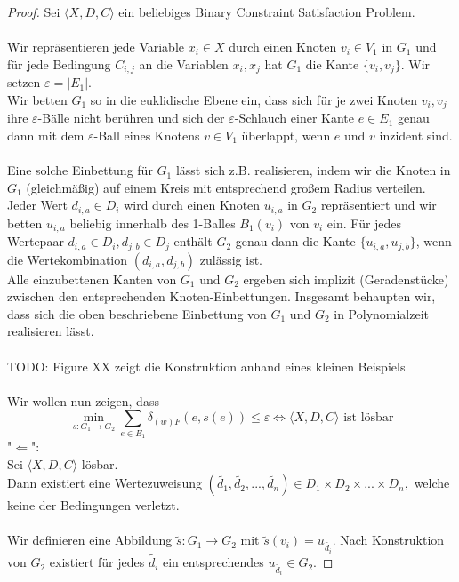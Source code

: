 \documentclass[a4paper, 12pt, twoside]{article}
\theoremstyle{Format1} %
\begin{document}
\begin{proof}
Sei $\langle X,D,C \rangle$ ein beliebiges Binary Constraint Satisfaction Problem.
\\
\\
Wir repräsentieren jede Variable $x_i \in X$ durch einen Knoten $v_i \in V_1$ in $G_1$ und für jede Bedingung $C_{i,j}$ an die Variablen $x_i, x_j$
hat $G_1$ die Kante $\{v_i, v_j\}$. Wir setzen $\varepsilon = |E_1|$.
\\
Wir betten $G_1$ so in die euklidische Ebene ein, dass sich für je zwei Knoten $v_i,v_j$ ihre $\varepsilon$-Bälle nicht berühren und
sich der $\varepsilon$-Schlauch einer Kante $e \in E_1$ genau dann mit dem $\varepsilon$-Ball eines Knotens $v \in V_1$ überlappt, wenn $e$ und $v$ inzident sind.
\\
\\
Eine solche Einbettung für $G_1$ lässt sich z.B. realisieren, indem wir die Knoten in $G_1$ (gleichmäßig) auf einem Kreis mit entsprechend großem Radius verteilen.
\\
Jeder Wert $d_{i,a} \in D_i$ wird durch einen Knoten $u_{i,a}$ in $G_2$ repräsentiert und wir betten $u_{i,a}$ beliebig innerhalb des 1-Balles $B_1(v_i)$ von $v_i$ ein.
Für jedes Wertepaar $d_{i,a} \in D_i, d_{j,b} \in D_j$ enthält $G_2$ genau dann die Kante $\{u_{i,a},u_{j,b}\}$, wenn die Wertekombination $(d_{i,a},d_{j,b})$
zulässig ist.
\\
Alle einzubettenen Kanten von $G_1$ und $G_2$ ergeben sich implizit (Geradenstücke) zwischen den entsprechenden Knoten-Einbettungen.
Insgesamt behaupten wir, dass sich die oben beschriebene Einbettung von $G_1$ und $G_2$ in Polynomialzeit realisieren lässt.
\\
\\
TODO: Figure XX zeigt die Konstruktion anhand eines kleinen Beispiels
\\
\\
Wir wollen nun zeigen, dass
$$ \min_{s: G_1 \to G_2} \sum_{e \in E_1} \delta_{(w)F}(e, s(e)) \leq \varepsilon \iff \langle X,D,C \rangle \text{ ist lösbar}$$
"$\Leftarrow$":
\\
Sei $\langle X,D,C \rangle$ lösbar.
\\
Dann existiert eine Wertezuweisung $(\tilde{d_1},\tilde{d_2},...,\tilde{d_n}) \in {D_1 \times D_2 \times ... \times D_n},$ welche keine der Bedingungen verletzt.
\\
\\
Wir definieren eine Abbildung $\tilde{s}:G_1 \to G_2$ mit $\tilde{s}(v_i) = u_{\tilde{d_i}}$.
Nach Konstruktion von $G_2$ existiert für jedes $\tilde{d_i}$ ein entsprechendes $u_{\tilde{d_i}} \in G_2$.

\end{proof}
\end{document}
